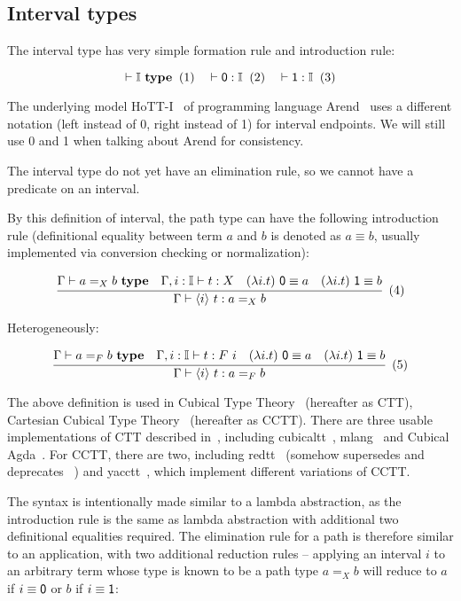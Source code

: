 \subsection{Interval types}
\label{subsec:interval}

The interval type has very simple formation rule
and introduction rule:

\[
  \vdash \mathbb I~\textbf{type}
  \xtag \quad
  \vdash \textsf 0 : \mathbb I
  \xtag \quad
  \vdash \textsf 1 : \mathbb I
  \xtag
\]

The underlying model HoTT-I~\cite{HoTT-I} of programming language
Arend~\cite{Arend} uses a different notation
(\textsf{left} instead of \textsf 0, \textsf{right} instead of \textsf 1)
for interval endpoints.
We will still use \textsf 0 and \textsf 1 when talking
about Arend for consistency.

The interval type do not yet have an elimination rule,
so we cannot have a predicate on an interval.

By this definition of interval, the path type can
have the following introduction rule
(definitional equality between term $a$ and $b$
is denoted as $a \equiv b$,
usually implemented via conversion checking or normalization):

\[
  \cfrac{
    \Gamma \vdash a =_X b~\textbf{type}
    \quad
    \Gamma, i : \mathbb I \vdash t : X
    \quad
    (\lambda i. t)~\textsf 0 \equiv a
    \quad
    (\lambda i. t)~\textsf 1 \equiv b
  }{
    \Gamma \vdash \lrangle i~t : a =_X b
  }
  \xtag
\]

Heterogeneously:

\[
  \cfrac{
    \Gamma \vdash a =_F b~\textbf{type}
    \quad
    \Gamma, i : \mathbb I \vdash t : F~i
    \quad
    (\lambda i. t)~\textsf 0 \equiv a
    \quad
    (\lambda i. t)~\textsf 1 \equiv b
  }{
    \Gamma \vdash \lrangle i~t : a =_F b
  }
  \xtag
\]

The above definition is used in Cubical Type Theory~\cite{CCHM,CHM}
(hereafter as CTT), Cartesian Cubical Type
Theory~\cite{CCTT,CCTT2,CHTT} (hereafter as CCTT).
There are three usable implementations of CTT described in~\cite{CHM},
including cubicaltt~\cite{CubicalTT},
mlang~\cite{Mlang} and Cubical Agda~\cite{CubicalAgda}.
For CCTT, there are two, including
redtt~\cite{RedTT} (somehow supersedes and deprecates
\RedPRL~\cite{RedPRL}) and yacctt~\cite{YaccTT},
which implement different variations of CCTT.

The syntax is intentionally made similar to a lambda abstraction,
as the introduction rule is the same as lambda abstraction with
additional two definitional equalities required.
The elimination rule for a path is therefore similar to an application,
with two additional reduction rules -- applying an interval $i$ to
an arbitrary term whose type is known to be a path type $a =_X b$
will reduce to $a$ if $i \equiv \textsf 0$ or $b$ if $i \equiv \textsf 1$:

